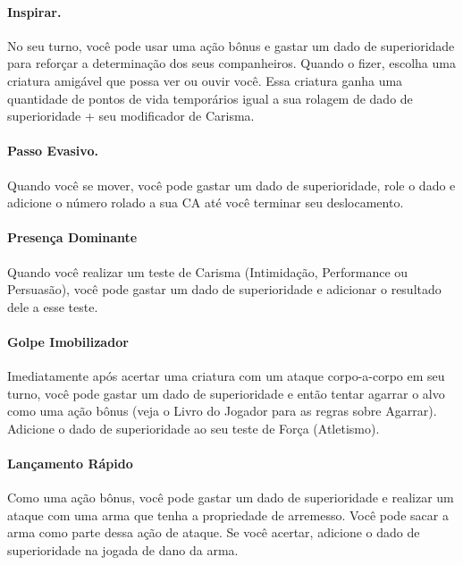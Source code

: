 \begin{multicols}{2}
\paragraph{Inspirar.} No seu turno, você pode usar uma ação bônus e gastar um
dado de superioridade para reforçar a determinação dos seus companheiros. Quando
o fizer, escolha uma criatura amigável que possa ver ou ouvir você. Essa
criatura ganha uma quantidade de pontos de vida temporários igual a sua rolagem
de dado de superioridade + seu modificador de Carisma.

\paragraph{Passo Evasivo.} Quando você se mover, você pode gastar um dado de
superioridade, role o dado e adicione o número rolado a sua CA até você terminar
seu deslocamento.

\paragraph{Presença Dominante} Quando você realizar um teste de Carisma
(Intimidação, Performance ou Persuasão), você pode gastar um dado de
superioridade e adicionar o resultado dele a esse teste.

\paragraph{Golpe Imobilizador} Imediatamente após acertar uma criatura com um
ataque corpo-a-corpo em seu turno, você pode gastar um dado de superioridade e
então tentar agarrar o alvo como uma ação bônus (veja o Livro do Jogador para as
regras sobre Agarrar). Adicione o dado de superioridade ao seu teste de Força
(Atletismo).

\paragraph{Lançamento Rápido} Como uma ação bônus, você pode gastar um dado de
superioridade e realizar um ataque com uma arma que tenha a propriedade de
arremesso. Você pode sacar a arma como parte dessa ação de ataque. Se você
acertar, adicione o dado de superioridade na jogada de dano da arma.
\end{multicols}

